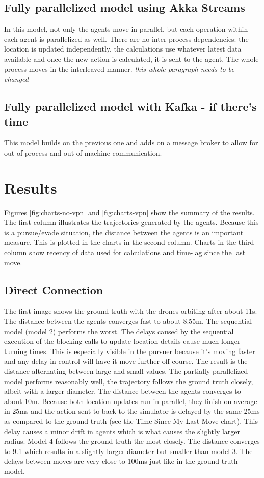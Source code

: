 \documentclass{article}
\begin{document}
\subsection{Fully parallelized model using Akka Streams}
In this model, not only the agents move in parallel, but each operation within each agent is parallelized as well. There are no inter-process dependencies: the location is updated independently, the calculations use whatever latest data available and once the new action is calculated, it is sent to the agent. The whole process moves in the interleaved manner. \emph{this whole paragraph needs to be changed}

\subsection{Fully parallelized model with Kafka - if there's time}
This model builds on the previous one and adds on a message broker to allow for out of process and out of machine communication. 

\section{Results}
Figures \ref{fig:charts-no-vpn} and \ref{fig:charts-vpn} show the summary of the results.  The first column illustrates the trajectories generated by the agents. Because this is a pursue/evade situation, the distance between the agents is an important measure. This is plotted in the charts in the second column.
Charts in the third column show recency of data used for calculations and time-lag since the last move.

\subsection{Direct Connection}
The first image shows the ground truth with the drones orbiting after about 11s. The distance between the agents converges fast to about 8.55m.
The sequential model (model 2) performs the worst. The delays caused by the sequential execution of the blocking calls to update location details cause much longer turning times. This is especially visible in the pursuer because it's moving faster and any delay in control will have it move further off course. The result is the distance alternating between large and small values.
The partially parallelized model performs reasonably well, the trajectory follows the ground truth closely, albeit with a larger diameter. The distance between the agents converges to about 10m. Because both location updates run in parallel, they finish on average in 25ms and the action sent to back to the simulator is delayed by the same 25ms as compared to the ground truth (see the Time Since My Last Move chart). This delay causes a minor drift in agents which is what causes the slightly larger radius.
Model 4 follows the ground truth the most closely. The distance converges to 9.1 which results in a slightly larger diameter but smaller than model 3. The delays between moves are very close to 100ms just like in the ground truth model.
\end{document}
